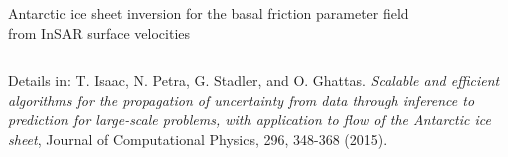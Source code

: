 \documentclass[10pt,final,xcolor=dvipsnames]{beamer}
\begin{document}
\begin{frame}
\begin{columns}
\begin{column}{0.49\paperwidth}
			\vspace{-0.1in}
			\begin{center}
				{\tiny Antarctic ice sheet inversion for the basal friction
					parameter field \\
					\vspace{-0.1in}
					from InSAR surface velocities}
			\end{center}
		\end{column}
	\end{columns}
	
	\vspace{0.3in}
	\scriptsize{Details in: T. Isaac, N. Petra, G. Stadler, and
		O. Ghattas. {\em Scalable and efficient algorithms for the
			propagation of uncertainty from data through inference to
			prediction for large-scale problems, with application to flow of
			the Antarctic ice sheet}, Journal of Computational Physics, 296,
		348-368 (2015).}
\end{frame}
\end{document}

